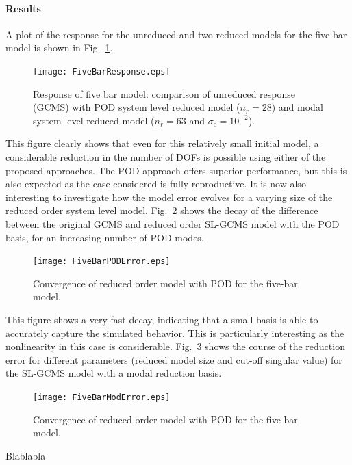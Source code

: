 \paragraph{Results}
A plot of the response for the unreduced and two reduced models for the five-bar model is shown in Fig.~\ref{fig:FiveBarResponse}.
\begin{figure}[htp]
\centering
\texttt{[image: FiveBarResponse.eps]} 
\caption{Response of five bar model: comparison of unreduced response (GCMS) with POD system level reduced model ($n_r=28$) and modal system level reduced model ($n_r=63$ and $\sigma_c=10^{-2}$).}
\label{fig:FiveBarResponse}
\end{figure}
This figure clearly shows that even for this relatively small initial model, a considerable reduction in the number of DOFs is possible using either of the proposed approaches. The POD approach offers superior performance, but this is also expected as the case considered is fully reproductive.
It is now also interesting to investigate how the model error evolves for a varying size of the reduced order system level model. 
Fig.~\ref{fig:FiveBarPODError} shows the decay of the difference between the original GCMS and reduced order SL-GCMS model with the POD basis, for an increasing number of POD modes. 
\begin{figure}[h!]
\centering
\texttt{[image: FiveBarPODError.eps]} 
\caption{Convergence of reduced order model with POD for the five-bar model.}
\label{fig:FiveBarPODError}
\end{figure}
This figure shows a very fast decay, indicating that a small basis is able to accurately capture the simulated behavior. This is particularly interesting as the nonlinearity in this case is considerable.
Fig.~\ref{fig:FiveBarModalError} shows the course of the reduction error for different parameters (reduced model size and cut-off singular value) for the SL-GCMS model with a modal reduction basis. 
\begin{figure}[htp]
\centering
\texttt{[image: FiveBarModError.eps]} 
\caption{Convergence of reduced order model with POD for the five-bar model.}
\label{fig:FiveBarModalError}
\end{figure}
Blablabla